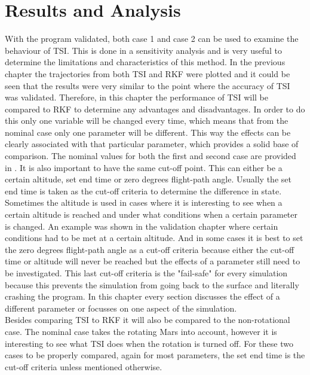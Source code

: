 \chapter{Results and Analysis} 
\label{ch:results}
With the program validated, both case 1 and case 2 can be used to examine the behaviour of \ac{TSI}. This is done in a sensitivity analysis and is very useful to determine the limitations and characteristics of this method. In the previous chapter the trajectories from both \ac{TSI} and \ac{RKF} were plotted and it could be seen that the results were very similar to the point where the accuracy of \ac{TSI} was validated. Therefore, in this chapter the performance of \ac{TSI} will be compared to \ac{RKF} to determine any advantages and disadvantages. In order to do this only one variable will be changed every time, which means that from the nominal case only one parameter will be different. This way the effects can be clearly associated with that particular parameter, which provides a solid base of comparison. The nominal values for both the first and second case are provided in . It is also important to have the same cut-off point. This can either be a certain altitude, set end time or zero degrees flight-path angle. Usually the set end time is taken as the cut-off criteria to determine the difference in state. Sometimes the altitude is used in cases where it is interesting to see when a certain altitude is reached and under what conditions when a certain parameter is changed. An example was shown in the validation chapter where certain conditions had to be met at a certain altitude. And in some cases it is best to set the zero degrees flight-path angle as a cut-off criteria because either the cut-off time or altitude will never be reached but the effects of a parameter still need to be investigated. This last cut-off criteria is the "fail-safe" for every simulation because this prevents the simulation from going back to the surface and literally crashing the program. In this chapter every section discusses the effect of a different parameter or focusses on one aspect of the simulation. \\

\noindent
Besides comparing \ac{TSI} to \ac{RKF} it will also be compared to the non-rotational case. The nominal case takes the rotating Mars into account, however it is interesting to see what \ac{TSI} does when the rotation is turned off. For these two cases to be properly compared, again for most parameters, the set end time is the cut-off criteria unless mentioned otherwise.\\

